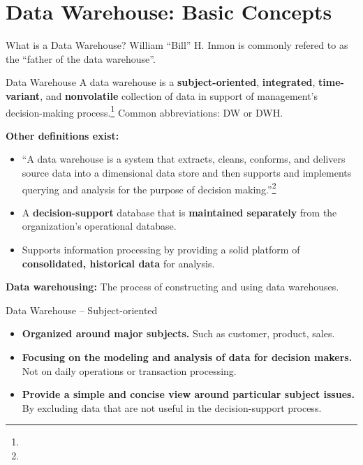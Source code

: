 \section{Data Warehouse: Basic Concepts}

\begin{frame}{What is a Data Warehouse?}
	William ``Bill'' H.  Inmon is commonly refered to as the ``father of the data warehouse''.
	\begin{block}{Data Warehouse}
		A data warehouse is a \textbf{subject-oriented}, \textbf{integrated}, \textbf{time-variant}, and \textbf{nonvolatile} collection of data in support of management's decision-making process.\footnote{} Common abbreviations: DW or DWH.
	\end{block}

	\small
	\textbf{Other definitions exist:}
	\begin{itemize}
		\item ``A data warehouse is a system that extracts, cleans, conforms, and delivers source data into a dimensional data store and then supports and implements querying and analysis for the purpose of decision making.''\footnote{}
		\item A \textbf{\color{airforceblue}decision-support} database that is
		      \textbf{\color{airforceblue}maintained separately} from the organization's
		      operational database.
		\item Supports information processing by providing a solid platform of
		      \textbf{\color{airforceblue}consolidated, historical data} for analysis.
	\end{itemize}

	\textbf{\color{airforceblue}Data warehousing:} The process of constructing and using data warehouses.
\end{frame}

\begin{frame}{Data Warehouse -- Subject-oriented}
	\begin{itemize}
		\item \textbf{Organized around major subjects.} Such as customer, product,
		      sales.
		\item \textbf{Focusing on the modeling and analysis of data for
				      {\color{airforceblue}decision makers}.} Not on daily operations or
		      transaction processing.
		\item \textbf{Provide a simple and concise view around particular
			      subject issues.} By excluding data that are not useful in the
		      decision-support process.
	\end{itemize}
\end{frame}

